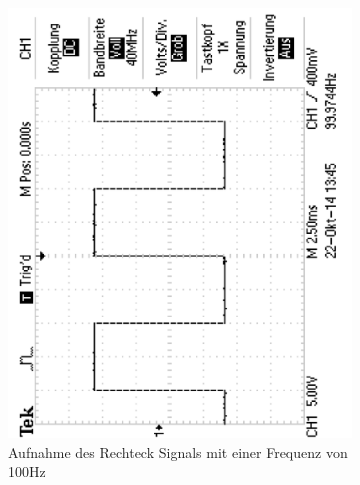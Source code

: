 \documentclass[12pt,a4paper]{article}
\begin{document}
\begin{figure}[H]
        \centering
        \begin{subfigure}[b]{0.28\textwidth}
                \includegraphics[width=\textwidth , scale = 0.4, angle = -90]{2_1_rech_100hz.pdf}
                \caption[Aufnahme des Rechtecksignals mit einer Frequenz von 100Hz]{Aufnahme des Rechteck Signals mit einer Frequenz von 100Hz}
                \label{fig:2_1_rech_100hz}
        \end{subfigure}%
        \hfill
        \begin{subfigure}[b]{0.28\textwidth}

\end{subfigure}
\end{figure}
\end{document}
